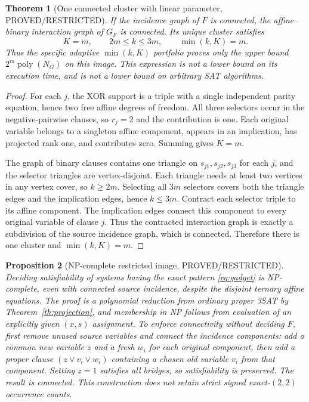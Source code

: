 \documentclass[11pt]{article}
\newtheorem{theorem}{Theorem}
\newtheorem{proposition}[theorem]{Proposition}
\newcommand{\poly}{\operatorname{poly}}
\begin{document}
\begin{theorem}[One connected cluster with linear parameter, PROVED/RESTRICTED]\label{th:params}
If the incidence graph of $F$ is connected, the affine--binary interaction graph of $G_F$ is connected. Its unique cluster satisfies
\[
\boxed{\ K=m,\qquad2m\le k\le3m,\qquad\min(k,K)=m.\ }
\]
Thus the specific adaptive $\min(k,K)$ portfolio proves only the upper bound $2^m\poly(N_G)$ on this image. This expression is not a lower bound on its execution time, and is not a lower bound on arbitrary SAT algorithms.
\end{theorem}
\begin{proof}
For each $j$, the XOR support is a triple with a single independent parity equation, hence two free affine degrees of freedom. All three selectors occur in the negative-pairwise clauses, so $r_j=2$ and the contribution is one. Each original variable belongs to a singleton affine component, appears in an implication, has projected rank one, and contributes zero. Summing gives $K=m$.

The graph of binary clauses contains one triangle on $s_{j1},s_{j2},s_{j3}$ for each $j$, and the selector triangles are vertex-disjoint. Each triangle needs at least two vertices in any vertex cover, so $k\ge2m$. Selecting all $3m$ selectors covers both the triangle edges and the implication edges, hence $k\le3m$. Contract each selector triple to its affine component. The implication edges connect this component to every original variable of clause $j$. Thus the contracted interaction graph is exactly a subdivision of the source incidence graph, which is connected. Therefore there is one cluster and $\min(k,K)=m$.
\end{proof}

\begin{proposition}[NP-complete restricted image, PROVED/RESTRICTED]
Deciding satisfiability of systems having the exact pattern \eqref{eq:gadget} is NP-complete, even with connected source incidence, despite the disjoint ternary affine equations. The proof is a polynomial reduction from ordinary proper 3SAT by Theorem~\ref{th:projection}, and membership in NP follows from evaluation of an explicitly given $(x,s)$ assignment. To enforce connectivity without deciding $F$, first remove unused source variables and connect the incidence components: add a common new variable $z$ and a fresh $w_i$ for each original component, then add a proper clause $(z\lor v_i\lor w_i)$ containing a chosen old variable $v_i$ from that component. Setting $z=1$ satisfies all bridges, so satisfiability is preserved. The result is connected. This construction does not retain strict signed exact-$(2,2)$ occurrence counts.
\end{proposition}
\end{document}
